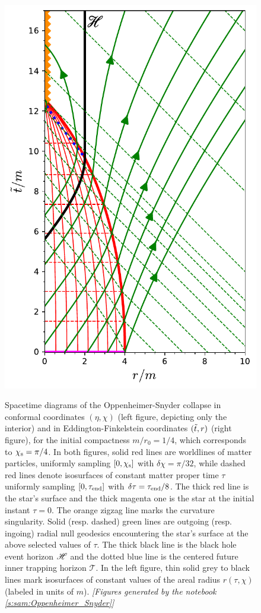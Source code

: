 \begin{figure}
{\includegraphics[height=0.6\textheight]{lem_OS_diag_EF.pdf}
}
\caption[]{\label{f:lem:OS:diag_int_EF} \footnotesize
Spacetime diagrams of the Oppenheimer-Snyder collapse
in conformal coordinates $(\eta,\chi)$ (left figure, depicting only the
interior)
and in Eddington-Finkelstein coordinates $({\tilde t}, r)$
(right figure), for the initial compactness $m/r_0 = 1/4$, which corresponds to $\chi_{\rm s} = \pi/4$.
In both figures, solid red lines are worldlines of matter particles,
uniformly sampling $[0,\chi_{\rm s}]$ with $\delta\chi=\pi/32$,
while dashed red lines denote isosurfaces of constant matter proper time $\tau$
uniformly sampling $[0,\tau_{\rm end}]$ with $\delta\tau = \tau_{\rm end}/8$.
The thick red line is the star's surface and the thick magenta one is
the star at the initial instant $\tau=0$. The orange zigzag line marks the
curvature singularity. Solid (resp. dashed) green lines are outgoing (resp. ingoing) radial null geodesics
encountering the star's surface at the above selected values of $\tau$.
The thick black line is the black hole event horizon $\mathscr{H}$ and the dotted blue line
is the centered future inner trapping horizon $\mathscr{T}$. In the left figure,
thin solid grey to black lines mark isosurfaces of constant values of the areal radius
$r(\tau,\chi)$ (labeled in units of $m$).
\textsl{[Figures generated by the notebook \ref{s:sam:Oppenheimer_Snyder}]}
}
\end{figure}



